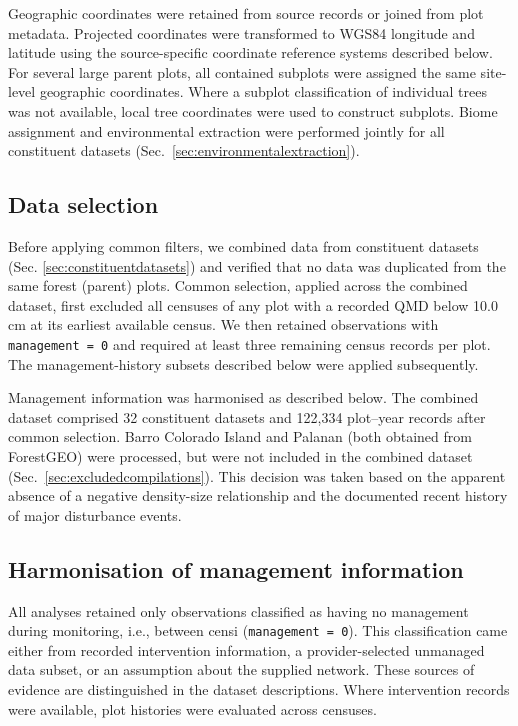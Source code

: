\documentclass{myreport}
\begin{document}
Geographic coordinates were retained from source records or joined from plot metadata. Projected coordinates were transformed to WGS84 longitude and latitude using the source-specific coordinate reference systems described below. For several large parent plots, all contained subplots were assigned the same site-level geographic coordinates. Where a subplot classification of individual trees was not available, local tree coordinates were used to construct subplots. Biome assignment and environmental extraction were performed jointly for all constituent datasets (Sec.~\ref{sec:environmentalextraction}).

\subsection{Data selection}
\label{sec:dataselection}

Before applying common filters, we combined data from constituent datasets (Sec. \ref{sec:constituentdatasets}) and verified that no data was duplicated from the same forest (parent) plots. Common selection, applied across the combined dataset, first excluded all censuses of any plot with a recorded QMD below 10.0 cm at its earliest available census. We then retained observations with \texttt{management = 0} and required at least three remaining census records per plot. The management-history subsets described below were applied subsequently.

Management information was harmonised as described below. The combined dataset comprised 32 constituent datasets and 122,334 plot--year records after common selection. Barro Colorado Island and Palanan (both obtained from ForestGEO) were processed, but were not included in the combined dataset (Sec.~\ref{sec:excludedcompilations}). This decision was taken based on the apparent absence of a negative density-size relationship and the documented recent history of major disturbance events.

\subsection{Harmonisation of management information}
\label{sec:managementharmonisation}

All analyses retained only observations classified as having no management during monitoring, i.e., between censi (\texttt{management = 0}). This classification came either from recorded intervention information, a provider-selected unmanaged data subset, or an assumption about the supplied network. These sources of evidence are distinguished in the dataset descriptions. Where intervention records were available, plot histories were evaluated across censuses.
\end{document}
